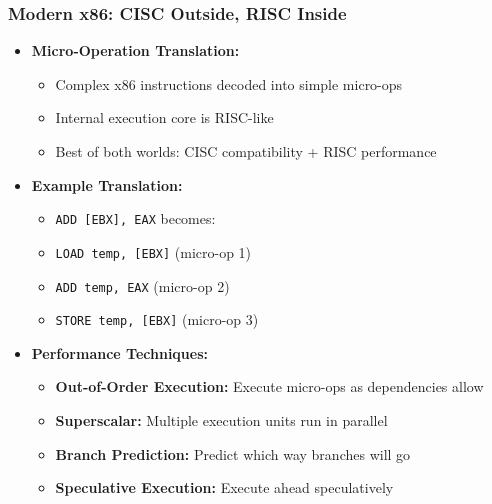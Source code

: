\begin{frame}
\frametitle{Modern x86: CISC Outside, RISC Inside}
\begin{itemize}
    \item \textbf{Micro-Operation Translation:}
    \begin{itemize}
        \item Complex x86 instructions decoded into simple micro-ops
        \item Internal execution core is RISC-like
        \item Best of both worlds: CISC compatibility + RISC performance
    \end{itemize}
    \item \textbf{Example Translation:}
    \begin{itemize}
        \item \texttt{ADD [EBX], EAX} becomes:
        \item \texttt{LOAD temp, [EBX]} (micro-op 1)
        \item \texttt{ADD temp, EAX} (micro-op 2)  
        \item \texttt{STORE temp, [EBX]} (micro-op 3)
    \end{itemize}
    \item \textbf{Performance Techniques:}
    \begin{itemize}
        \item \textbf{Out-of-Order Execution:} Execute micro-ops as dependencies allow
        \item \textbf{Superscalar:} Multiple execution units run in parallel
        \item \textbf{Branch Prediction:} Predict which way branches will go
        \item \textbf{Speculative Execution:} Execute ahead speculatively
    \end{itemize}
\end{itemize}
\end{frame}

